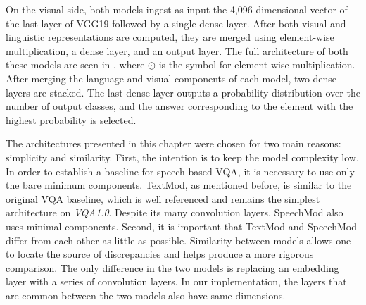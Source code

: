 \documentclass[letterpaper]{article} %
\begin{document}
On the visual side, both models ingest as input the 4,096 dimensional vector of the last layer of VGG19 \cite{vgg16} followed by a single dense layer. After both visual and linguistic representations are computed, they are merged using element-wise multiplication, a dense layer, and an output layer. The full architecture of both these models are seen in , where $\displaystyle\odot$ is the symbol for element-wise multiplication. After merging the language and visual components of each model, two dense layers are stacked. The last dense layer outputs a probability distribution over the number of output classes, and the answer corresponding to the element with the highest probability is selected.

The architectures presented in this chapter were chosen for two main reasons: simplicity and similarity. First, the intention is to keep the model complexity low. In order to establish a baseline for speech-based VQA, it is necessary to use only the bare minimum components. TextMod, as mentioned before, is similar to the original VQA baseline, which is well referenced and remains the simplest architecture on \textit{VQA1.0}. Despite its many convolution layers, SpeechMod also uses minimal components. Second, it is important that TextMod and SpeechMod differ from each other as little as possible. Similarity between models allows one to locate the source of discrepancies and helps produce a more rigorous comparison. The only difference in the two models is replacing an embedding layer with a series of convolution layers. In our implementation, the layers that are common between the two models also have same dimensions.
\end{document}
